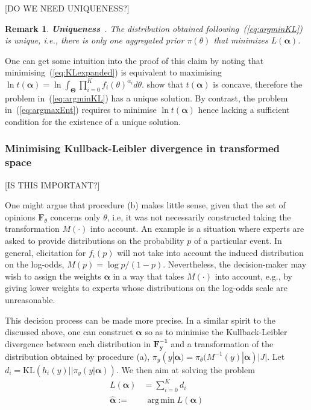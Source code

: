 \documentclass[a4paper, notitlepage, 10pt]{article}
\DeclareMathOperator*{\argmin}{arg\,min}
\newtheorem{remark}{Remark}[]
\begin{document}
[DO WE NEED UNIQUENESS?]

\begin{remark}
\label{remark:uniqueness}
\textbf{Uniqueness}~\citep{rufo2012A}.
 The distribution obtained following~(\ref{eq:argminKL}) is unique, i.e., there is only one aggregated prior $\pi(\theta)$ that minimizes $L(\boldsymbol\alpha)$.
\end{remark}
One can get some intuition into the proof  of this claim by noting that minimising~(\ref{eq:KLexpanded}) is equivalent to maximising $\ln t(\boldsymbol\alpha) = \ln\int_{\boldsymbol\Theta}\prod_{i=0}^{K}f_i(\theta)^{\alpha_i}d\theta$. 
\cite{rufo2012A} show that $t(\boldsymbol\alpha)$ is concave, therefore the problem in~(\ref{eq:argminKL}) has a unique solution.
By contrast, the problem in~(\ref{eq:argmaxEnt}) requires to minimise $\ln t(\boldsymbol\alpha)$ hence lacking a sufficient condition for the existence of a unique solution.



\subsubsection*{Minimising Kullback-Leibler divergence in transformed space}

[IS THIS IMPORTANT?]

One might argue that procedure (b) makes little sense, given that the set of opinions $\mathbf{F}_{\theta}$ concerns only $\theta$, i.e, it was not necessarily constructed taking the transformation $M(\cdot)$ into account.
An example is a situation where experts are asked to provide distributions on the probability $p$ of a particular event.
In general, elicitation for $f_i(p)$ will not take into account the induced distribution on the log-odds, $M(p) = \log p/(1-p)$.
Nevertheless, the decision-maker may wish to assign the weights $\boldsymbol\alpha$ in a way that takes $M(\cdot)$ into account, e.g., by giving lower weights to experts whose distributions on the log-odds scale are unreasonable.

This decision process can be made more precise.
In a similar spirit to the discussed above, one can construct $\boldsymbol\alpha$ so as to minimise the Kullback-Leibler divergence between each distribution in $\mathbf{F^{-1}_y}$ and a transformation of the distribution obtained by procedure (a), $\pi_{y}(y | \boldsymbol\alpha) = \pi_{\theta}( M^{-1}(y)| \boldsymbol\alpha)|J|$.
Let $d_i = \text{KL}( h_i(y) || \pi_{y}(y | \boldsymbol\alpha))$.
We then aim at solving the problem
\begin{align}
L(\boldsymbol\alpha) &= \sum_{i=0}^Kd_i \\
     \hat{\boldsymbol\alpha}:=& \:\argmin L(\boldsymbol\alpha)  \nonumber
\end{align}
\end{document}
